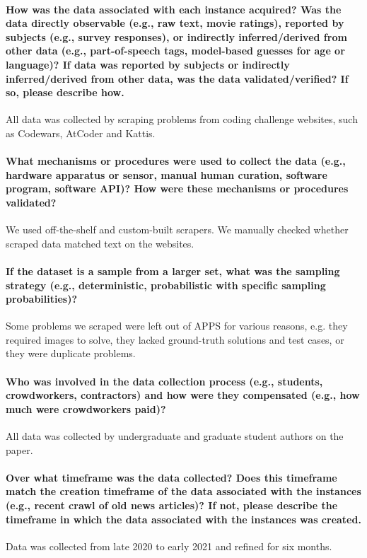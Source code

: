 \documentclass{article}
\begin{document}
\paragraph{How was the data associated with each instance acquired? Was
the data directly observable (e.g., raw text, movie ratings), reported by
subjects (e.g., survey responses), or indirectly inferred/derived from other
data (e.g., part-of-speech tags, model-based guesses for age or language)?
If data was reported by subjects or indirectly inferred/derived from other
data, was the data validated/verified? If so, please describe how.}
All data was collected by scraping problems from coding challenge websites, such as Codewars, AtCoder and Kattis.


\paragraph{What mechanisms or procedures were used to collect the data
(e.g., hardware apparatus or sensor, manual human curation, software program, software API)? How were these mechanisms or procedures validated?}
We used off-the-shelf and custom-built scrapers. We manually checked whether scraped data matched text on the websites.

\paragraph{If the dataset is a sample from a larger set, what was the sampling
strategy (e.g., deterministic, probabilistic with specific sampling
probabilities)?}
Some problems we scraped were left out of APPS for various reasons, e.g. they required images to solve, they lacked ground-truth solutions and test cases, or they were duplicate problems.

\paragraph{Who was involved in the data collection process (e.g., students,
crowdworkers, contractors) and how were they compensated (e.g.,
how much were crowdworkers paid)?}
All data was collected by undergraduate and graduate student authors on the paper.

\paragraph{Over what timeframe was the data collected? Does this timeframe
match the creation timeframe of the data associated with the instances
(e.g., recent crawl of old news articles)? If not, please describe the timeframe in which the data associated with the instances was created.}
Data was collected from late 2020 to early 2021 and refined for six months.
\end{document}
